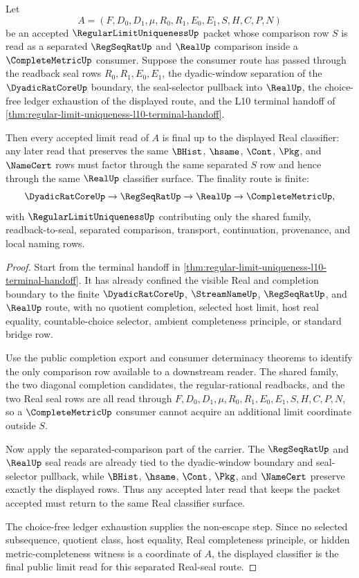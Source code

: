 \begin{theorem}
\label{thm:regular-limit-uniqueness-separated-real-seal-finality}
Let
$$
A=(F,D_0,D_1,\mu,R_0,R_1,E_0,E_1,S,H,C,P,N)
$$
be an accepted $\RegularLimitUniquenessUp$ packet whose comparison row $S$ is read as a separated $\RegSeqRatUp$ and $\RealUp$ comparison inside a $\CompleteMetricUp$ consumer. Suppose the consumer route has passed through the readback seal rows $R_0,R_1,E_0,E_1$, the dyadic-window separation of the $\DyadicRatCoreUp$ boundary, the seal-selector pullback into $\RealUp$, the choice-free ledger exhaustion of the displayed route, and the L10 terminal handoff of \autoref{thm:regular-limit-uniqueness-l10-terminal-handoff}.

Then every accepted limit read of $A$ is final up to the displayed Real classifier: any later read that preserves the same $\BHist$, $\hsame$, $\Cont$, $\Pkg$, and $\NameCert$ rows must factor through the same separated $S$ row and hence through the same $\RealUp$ classifier surface. The finality route is finite:
$$
\DyadicRatCoreUp \to \RegSeqRatUp \to \RealUp \to \CompleteMetricUp,
$$
with $\RegularLimitUniquenessUp$ contributing only the shared family, readback-to-seal, separated comparison, transport, continuation, provenance, and local naming rows.
\end{theorem}
\begin{proof}
Start from the terminal handoff in \autoref{thm:regular-limit-uniqueness-l10-terminal-handoff}. It has already confined the visible Real and completion boundary to the finite $\DyadicRatCoreUp$, $\StreamNameUp$, $\RegSeqRatUp$, and $\RealUp$ route, with no quotient completion, selected host limit, host real equality, countable-choice selector, ambient completeness principle, or standard bridge row.

Use the public completion export and consumer determinacy theorems to identify the only comparison row available to a downstream reader. The shared family, the two diagonal completion candidates, the regular-rational readbacks, and the two Real seal rows are all read through $F,D_0,D_1,\mu,R_0,R_1,E_0,E_1,S,H,C,P,N$, so a $\CompleteMetricUp$ consumer cannot acquire an additional limit coordinate outside $S$.

Now apply the separated-comparison part of the carrier. The $\RegSeqRatUp$ and $\RealUp$ seal reads are already tied to the dyadic-window boundary and seal-selector pullback, while $\BHist$, $\hsame$, $\Cont$, $\Pkg$, and $\NameCert$ preserve exactly the displayed rows. Thus any accepted later read that keeps the packet accepted must return to the same Real classifier surface.

The choice-free ledger exhaustion supplies the non-escape step. Since no selected subsequence, quotient class, host equality, Real completeness principle, or hidden metric-completeness witness is a coordinate of $A$, the displayed classifier is the final public limit read for this separated Real-seal route.
\end{proof}


